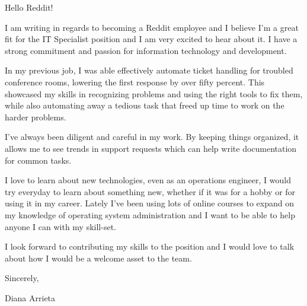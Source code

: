 Hello Reddit!

I am writing in regards to becoming a Reddit employee and I believe I'm a great fit for the IT Specialist position and I am very excited to hear about it. I have a strong commitment and passion for information technology and development.

In my previous job, I was able effectively automate ticket handling for troubled conference rooms, lowering the first response by over fifty percent. This showcased my skills in recognizing problems and using the right tools to fix them, while also automating away a tedious task that freed up time to work on the harder problems.

I've always been diligent and careful in my work. By keeping things organized, it allows me to see trends in support requests which can help write documentation for common tasks.

I love to learn about new technologies, even as an operations engineer, I would try everyday to learn about something new, whether if it was for a hobby or for using it in my career. Lately I've been using lots of online courses to expand on my knowledge of operating system administration and I want to be able to help anyone I can with my skill-set. 

I look forward to contributing my skills to the position and I would love to talk about how I would be a welcome asset to the team.

Sincerely,

Diana Arrieta
